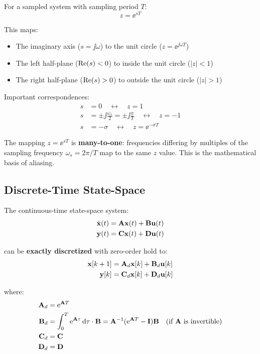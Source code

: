For a sampled system with sampling period $T$:
\begin{equation}
z = \ee^{sT}
\end{equation}

This maps:
\begin{itemize}
    \item The imaginary axis ($s = \jj\omega$) to the unit circle ($z = \ee^{\jj\omega T}$)
    \item The left half-plane ($\operatorname{Re}(s) < 0$) to inside the unit circle ($|z| < 1$)
    \item The right half-plane ($\operatorname{Re}(s) > 0$) to outside the unit circle ($|z| > 1$)
\end{itemize}

Important correspondences:
\begin{align}
s &= 0 \quad \leftrightarrow \quad z = 1 \\
s &= \pm\jj\frac{\omega_s}{2} = \pm\jj\frac{\pi}{T} \quad \leftrightarrow \quad z = -1 \\
s &= -\sigma \quad \leftrightarrow \quad z = \ee^{-\sigma T}
\end{align}

\begin{warningbox}
The mapping $z = \ee^{sT}$ is \textbf{many-to-one}: frequencies differing by multiples of the sampling frequency $\omega_s = 2\pi/T$ map to the same $z$ value. This is the mathematical basis of aliasing.
\end{warningbox}

\subsection{Discrete-Time State-Space}

The continuous-time state-space system:
\begin{align}
\dot{\mathbf{x}}(t) &= \mathbf{A}\mathbf{x}(t) + \mathbf{B}\mathbf{u}(t) \\
\mathbf{y}(t) &= \mathbf{C}\mathbf{x}(t) + \mathbf{D}\mathbf{u}(t)
\end{align}

can be \textbf{exactly discretized} with zero-order hold to:
\begin{align}
\mathbf{x}[k+1] &= \mathbf{A}_d\mathbf{x}[k] + \mathbf{B}_d\mathbf{u}[k] \\
\mathbf{y}[k] &= \mathbf{C}_d\mathbf{x}[k] + \mathbf{D}_d\mathbf{u}[k]
\end{align}

where:
\begin{align}
\mathbf{A}_d &= \mathrm{e}^{\mathbf{A} T} \\
\mathbf{B}_d &= \int_0^T \mathrm{e}^{\mathbf{A}\tau}\,\mathrm{d}\tau \cdot \mathbf{B} = \mathbf{A}^{-1}(\mathrm{e}^{\mathbf{A} T} - \mathbf{I})\mathbf{B} \quad (\text{if } \mathbf{A} \text{ is invertible}) \\
\mathbf{C}_d &= \mathbf{C} \\
\mathbf{D}_d &= \mathbf{D}
\end{align}

